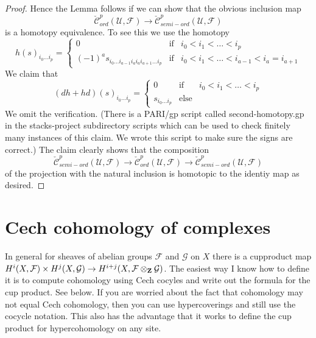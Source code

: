 \begin{proof}
\medskip\noindent
Hence the Lemma follows if we can show that the obvious inclusion map
$$
\check{\mathcal{C}}_{ord}^p(\mathcal{U}, \mathcal{F})
\longrightarrow
\check{\mathcal{C}}_{semi-ord}^p(\mathcal{U}, \mathcal{F})
$$
is a homotopy equivalence. To see this we use the homotopy
\begin{equation}
\label{equation-second-homotopy}
h(s)_{i_0 \ldots i_p} =
\left\{
\begin{matrix}
0 & \text{if} & i_0 < i_1 < \ldots < i_p \\
(-1)^a s_{i_0 \ldots i_{a - 1} i_a i_a i_{a + 1} \ldots i_p}
& \text{if} & i_0 < i_1 < \ldots < i_{a - 1} < i_a = i_{a + 1}
\end{matrix}
\right.
\end{equation}
We claim that
$$
(dh + hd)(s)_{i_0 \ldots i_p} =
\left\{
\begin{matrix}
0 & \text{if} & i_0 < i_1 < \ldots < i_p \\
s_{i_0 \ldots i_p}
& \text{else} &
\end{matrix}
\right.
$$
We omit the verification. (There is a PARI/gp script called second-homotopy.gp
in the stacks-project subdirectory scripts which can be used to check
finitely many instances of this claim.
We wrote this script to make sure the signs are correct.)
The claim clearly shows that the composition
$$
\check{\mathcal{C}}_{semi-ord}^p(\mathcal{U}, \mathcal{F})
\longrightarrow
\check{\mathcal{C}}_{ord}^p(\mathcal{U}, \mathcal{F})
\longrightarrow
\check{\mathcal{C}}_{semi-ord}^p(\mathcal{U}, \mathcal{F})
$$
of the projection with the natural inclusion
is homotopic to the identiy map as desired.
\end{proof}









\section{Cech cohomology of complexes}
\label{section-cech-cohomology-of-complexes}

\noindent
In general for sheaves of abelian groups
${\mathcal F}$ and ${\mathcal G}$ on $X$ there is a cupproduct map
$H^i(X, {\mathcal F}) \times H^j(X, {\mathcal G}) \to
H^{i + j}(X, {\mathcal F}\otimes_{\bf Z} {\mathcal G})$. The easiest way
I know how to define it is to compute cohomology using Cech
cocyles and write out the formula for the cup product. See below.
If you are worried about the fact that cohomology may not
equal Cech cohomology, then you can use hypercoverings and still
use the cocycle notation. This also has the advantage that
it works to define the cup product for hypercohomology on any site.


